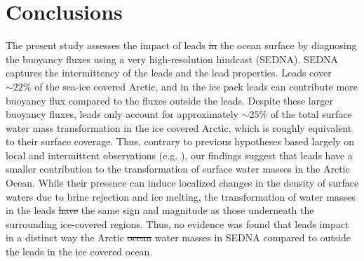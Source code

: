 \documentclass[lineno,sn-basic]{sn-jnl}%
\providecommand{\DIFadd}[1]{{\protect\color{blue}\uwave{#1}}} %
\providecommand{\DIFdel}[1]{{\protect\color{red}\sout{#1}}}                      %
\providecommand{\DIFaddbegin}{} %
\providecommand{\DIFaddend}{} %
\providecommand{\DIFdelbegin}{} %
\providecommand{\DIFdelend}{} %
\newcommand{\DIFscaledelfig}{0.5}
\newlength{\DIFdelgraphicswidth} %
\newlength{\DIFdelgraphicsheight} %
\newcommand{\DIFaddincludegraphics}[2][]{{\color{blue}\fbox{\DIFOincludegraphics[#1]{#2}}}} %
\newcommand{\DIFdelincludegraphics}[2][]{%
\sbox{\DIFdelgraphicsbox}{\DIFOincludegraphics[#1]{#2}}%
\settoboxwidth{\DIFdelgraphicswidth}{\DIFdelgraphicsbox} %
\settoboxtotalheight{\DIFdelgraphicsheight}{\DIFdelgraphicsbox} %
\scalebox{\DIFscaledelfig}{%
\parbox[b]{\DIFdelgraphicswidth}{\usebox{\DIFdelgraphicsbox}\\[-\baselineskip] \rule{\DIFdelgraphicswidth}{0em}}\llap{\resizebox{\DIFdelgraphicswidth}{\DIFdelgraphicsheight}{%
\setlength{\unitlength}{\DIFdelgraphicswidth}%
\begin{picture}(1,1)%
\thicklines\linethickness{2pt} %
{\color[rgb]{1,0,0}\put(0,0){\framebox(1,1){}}}%
{\color[rgb]{1,0,0}\put(0,0){\line( 1,1){1}}}%
{\color[rgb]{1,0,0}\put(0,1){\line(1,-1){1}}}%
\end{picture}%
}\hspace*{3pt}}} %
} %
\DeclareRobustCommand{\DIFaddbegin}{\DIFOaddbegin \let\includegraphics\DIFaddincludegraphics} %
\DeclareRobustCommand{\DIFaddend}{\DIFOaddend \let\includegraphics\DIFOincludegraphics} %
\DeclareRobustCommand{\DIFdelbegin}{\DIFOdelbegin \let\includegraphics\DIFdelincludegraphics} %
\DeclareRobustCommand{\DIFdelend}{\DIFOaddend \let\includegraphics\DIFOincludegraphics} %
\begin{document}
\section{Conclusions}

The present study assesses the impact of leads \DIFdelbegin \DIFdel{in }\DIFdelend \DIFaddbegin \DIFadd{on }\DIFaddend the ocean surface by diagnosing the buoyancy fluxes using a very high-resolution hindcast (SEDNA). 
SEDNA captures the intermittency of the leads and the lead properties. Leads cover $\sim 22\%$ of the sea-ice covered Arctic, and in the ice pack leads can contribute more buoyancy flux compared to the fluxes outside the leads. Despite these larger buoyancy fluxes, leads only account for approximately $\sim 25\%$ of the total surface water mass transformation in the ice covered Arctic, which is roughly equivalent to their surface coverage. Thus, contrary to previous hypotheses based largely on local and intermittent observations (e.g. \citet{Hutter_identification_2019, McPhee_LKF_2005}), our findings suggest that leads have a smaller contribution to the transformation of surface water masses in the Arctic Ocean. While their presence can induce localized changes in the density of surface waters due to brine rejection and ice melting, 
the transformation of water masses in the leads \DIFdelbegin \DIFdel{have }\DIFdelend \DIFaddbegin \DIFadd{has }\DIFaddend the same sign and magnitude as those underneath the surrounding ice-covered regions. Thus, no evidence was found that leads impact in a distinct way the Arctic \DIFdelbegin \DIFdel{ocean }\DIFdelend \DIFaddbegin \DIFadd{Ocean }\DIFaddend water masses in SEDNA compared to outside the leads in the ice covered ocean.
\end{document}
